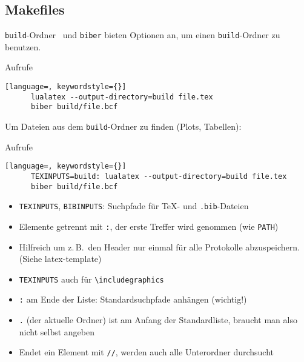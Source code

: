 \subsection{Makefiles}

\begin{frame}[fragile]{\texttt{build}-Ordner}
  \LuaTeX\ und \texttt{biber} bieten Optionen an, um einen \texttt{build}-Ordner zu benutzen.
  \begin{block}{Aufrufe}
    \begin{lstlisting}[language=, keywordstyle={}]
      lualatex --output-directory=build file.tex
      biber build/file.bcf
    \end{lstlisting}
  \end{block}

  Um Dateien aus dem \texttt{build}-Ordner zu finden (Plots, Tabellen):
  \begin{block}{Aufrufe}
    \begin{lstlisting}[language=, keywordstyle={}]
      TEXINPUTS=build: lualatex --output-directory=build file.tex
      biber build/file.bcf
    \end{lstlisting}
  \end{block}
  \vspace*{-0.5em}
  \begin{itemize}
    \item \texttt{TEXINPUTS}, \texttt{BIBINPUTS}: Suchpfade für \TeX- und \texttt{.bib}-Dateien
    \item Elemente getrennt mit \texttt{:}, der erste Treffer wird genommen (wie \texttt{PATH})
    \item Hilfreich um z.\,B.\ den Header nur einmal für alle Protokolle abzuspeichern. (Siehe latex-template)
    \item \texttt{TEXINPUTS} auch für \lstinline+\includegraphics+
    \item \texttt{:} am Ende der Liste: Standardsuchpfade anhängen (wichtig!)
    \item \texttt{.} (der aktuelle Ordner) ist am Anfang der Standardliste, braucht man also nicht selbst angeben
    \item Endet ein Element mit \texttt{//}, werden auch alle Unterordner durchsucht
  \end{itemize}
\end{frame}

